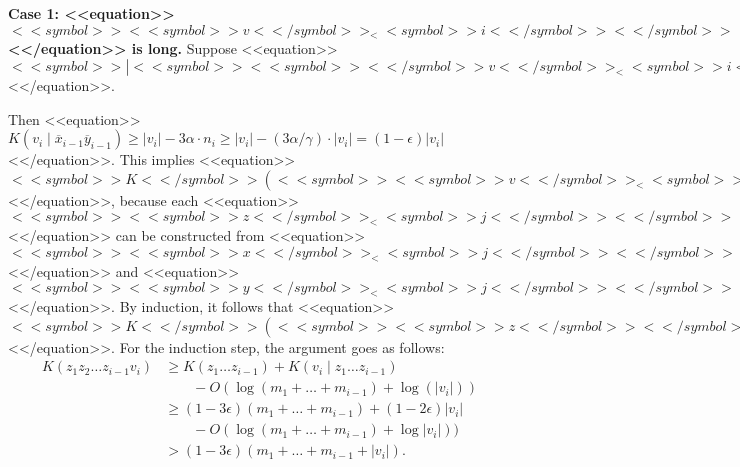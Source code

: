\documentclass[proceedings]{stacs}
\newcommand{\barx}{\overline{x}}
\newcommand{\bary}{\overline{y}}
\begin{document}
{\bf Case 1: <<equation>>$<<symbol>><<symbol>>v<</symbol>>_<<symbol>>i<</symbol>><</symbol>>$<</equation>> is long.} Suppose <<equation>>$<<symbol>>|<<symbol>><<symbol>><</symbol>>v<</symbol>>_<<symbol>>i<<symbol>><</symbol>><</symbol>>|<</symbol>> \geq <<symbol>>\gamma <</symbol>>\cdot <<symbol>><<symbol>>n<</symbol>>_<<symbol>>i<</symbol>><</symbol>>$<</equation>>.

Then <<equation>>$K(v_i \mid \barx_{i-1}\bary_{i-1}) \geq |v_i| - 3\alpha \cdot n_i \geq |v_i| - (3\alpha/\gamma) \cdot |v_i| = (1-\epsilon) |v_i|$<</equation>>.
This implies <<equation>>$<<symbol>>K<</symbol>>(<<symbol>><<symbol>>v<</symbol>>_<<symbol>>i<</symbol>><</symbol>> \mid <<symbol>><<symbol>>z<</symbol>><</symbol>>_1 \ldots <<symbol>><<symbol>>z<</symbol>>_{<<symbol>>i<</symbol>><</symbol>>-1}) > (1-<<symbol>>\epsilon<</symbol>>) \cdot <<symbol>>|<<symbol>><<symbol>><</symbol>>v<</symbol>>_<<symbol>>i<<symbol>><</symbol>><</symbol>>|<</symbol>> - <<symbol>>O<</symbol>>(1) \geq (1-2<<symbol>>\epsilon<</symbol>>)<<symbol>>|<<symbol>><<symbol>><</symbol>>v<</symbol>>_<<symbol>>i<<symbol>><</symbol>><</symbol>>|<</symbol>>$<</equation>>, because each <<equation>>$<<symbol>><<symbol>>z<</symbol>>_<<symbol>>j<</symbol>><</symbol>>$<</equation>> can be constructed from <<equation>>$<<symbol>><<symbol>>x<</symbol>>_<<symbol>>j<</symbol>><</symbol>>$<</equation>> and <<equation>>$<<symbol>><<symbol>>y<</symbol>>_<<symbol>>j<</symbol>><</symbol>>$<</equation>>.
By induction, it follows that <<equation>>$<<symbol>>K<</symbol>>(<<symbol>><<symbol>>z<</symbol>><</symbol>>_1 <<symbol>><<symbol>>z<</symbol>><</symbol>>_2 \ldots <<symbol>><<symbol>>z<</symbol>>_{<<symbol>>i<</symbol>><</symbol>>-1} <<symbol>><<symbol>>v<</symbol>>_<<symbol>>i<</symbol>><</symbol>>) \geq (1-3<<symbol>>\epsilon<</symbol>>) <<symbol>>|<<symbol>><<symbol>><</symbol>>z<</symbol>><</symbol>>_1 <<symbol>><<symbol>>z<</symbol>><</symbol>>_2 \ldots <<symbol>><<symbol>>z<</symbol>>_{<<symbol>>i<</symbol>><</symbol>>-1} <<symbol>><<symbol>>v<</symbol>>_<<symbol>>i<<symbol>><</symbol>><</symbol>>|<</symbol>>$<</equation>>. For the induction step, the argument goes as follows:
\[
\begin{array}{ll}
K(z_1 z_2 \ldots z_{i-1} v_i) & \geq K(z_1 \ldots z_{i-1}) + K(v_i \mid z_1 \ldots z_{i-1}) \\
& \quad \quad  - O(\log (m_1 + \ldots + m_{i-1}) + \log(|v_i|)) \\
& \geq (1-3\epsilon)(m_1 + \ldots + m_{i-1}) + (1-2\epsilon)|v_i| \\
& \quad \quad - O(\log(m_1 + \ldots +m_{i-1}) + \log |v_i|)) \\
& > (1-3\epsilon) (m_1 + \ldots + m_{i-1} + |v_i|).
\end{array}
\]
\end{document}
